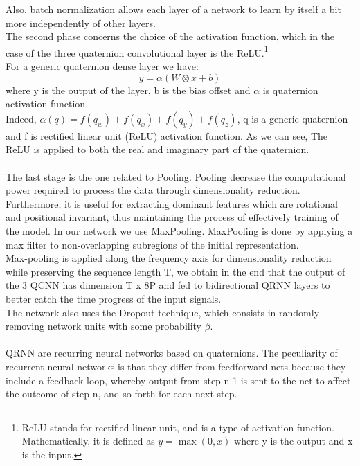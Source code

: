 \documentclass{article}
\begin{document}
    Also, batch normalization allows each layer of a network to learn by itself a bit more independently of other layers.
    \\ The second phase concerns the choice of the activation function, which in the case of the three quaternion convolutional layer 
    is the ReLU.\footnote{ReLU stands for rectified linear unit, and is a type of activation function. Mathematically, it is defined 
    as $y = \max(0, x)$ where y is the output and x is the input.}
    \\ For a generic quaternion dense layer we have:
    \begin{equation*}
        y = \alpha( W \otimes x + b)
    \end{equation*}
    where  y is the output of the layer, b is the bias offset and $\alpha$ is quaternion activation function.
    \\ Indeed,  $\alpha(q) = f(q_w) + f(q_x) + f(q_y) + f(q_z)$, q is a generic quaternion and f is rectified linear unit (ReLU) 
    activation function. As we can see, The ReLU is applied to both the real and imaginary part of the quaternion.
    \\ \\ The last stage is the one related to Pooling. Pooling decrease the computational power required to process the data through 
    dimensionality reduction. Furthermore, it is useful for extracting dominant features which are rotational and positional invariant,
    thus maintaining the process of effectively training of the model. In our network we use MaxPooling.
    MaxPooling is done by applying a max filter to non-overlapping subregions of the initial representation.
    \\ Max-pooling is applied along the frequency axis for 
    dimensionality reduction while preserving the sequence length T, we obtain in the end that the output of the 3 QCNN has 
    dimension T x 8P and fed to bidirectional QRNN layers to better catch the time progress of the input signals.  
    \\ The network also uses the Dropout technique, which consists in randomly removing network units with some probability $\beta$.
    \\ \\ QRNN are recurring neural networks based on quaternions.
    The peculiarity of recurrent neural networks is that they differ from feedforward nets because they include a feedback loop,
    whereby output from step n-1 is sent to the net to affect the outcome of step n, and so forth for each next step.
\end{document}
